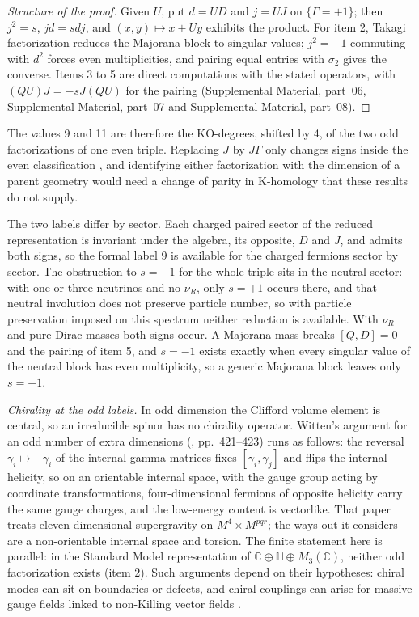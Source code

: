 \documentclass[aps,prd,reprint,onecolumn,nofootinbib,amsmath,amssymb,floatfix]{revtex4-2}
\theoremstyle{plain}
\newcommand{\supp}[1]{Supplemental Material, part~#1}
\newcommand{\C}{\mathbb C}
\renewcommand{\H}{\mathbb H}
\begin{document}
\begin{proof}[Structure of the proof]
Given $U$, put $d=UD$ and $j=UJ$ on $\{\Gamma=+1\}$; then $j^2=s$, $jd=sdj$, and $(x,y)\mapsto x+Uy$ exhibits the product. For item 2, Takagi factorization reduces the Majorana block to singular values; $j^2=-1$ commuting with $d^2$ forces even multiplicities, and pairing equal entries with $\sigma_2$ gives the converse. Items 3 to 5 are direct computations with the stated operators, with $(QU)J=-sJ(QU)$ for the pairing (\supp{06}, \supp{07} and \supp{08}).
\end{proof}

The values 9 and 11 are therefore the KO-degrees, shifted by 4, of the two odd factorizations of one even triple. Replacing $J$ by $J\Gamma$ only changes signs inside the even classification \cite{DD2011}, and identifying either factorization with the dimension of a parent geometry would need a change of parity in K-homology that these results do not supply.

The two labels differ by sector. Each charged paired sector of the reduced representation is invariant under the algebra, its opposite, $D$ and $J$, and admits both signs, so the formal label 9 is available for the charged fermions sector by sector. The obstruction to $s=-1$ for the whole triple sits in the neutral sector: with one or three neutrinos and no $\nu_R$, only $s=+1$ occurs there, and that neutral involution does not preserve particle number, so with particle preservation imposed on this spectrum neither reduction is available. With $\nu_R$ and pure Dirac masses both signs occur. A Majorana mass breaks $[Q,D]=0$ and the pairing of item 5, and $s=-1$ exists exactly when every singular value of the neutral block has even multiplicity, so a generic Majorana block leaves only $s=+1$.

\emph{Chirality at the odd labels.} In odd dimension the Clifford volume element is central, so an irreducible spinor has no chirality operator. Witten's argument for an odd number of extra dimensions (\cite{Witten1981}, pp.~421--423) runs as follows: the reversal $\gamma_i\mapsto-\gamma_i$ of the internal gamma matrices fixes $[\gamma_i,\gamma_j]$ and flips the internal helicity, so on an orientable internal space, with the gauge group acting by coordinate transformations, four-dimensional fermions of opposite helicity carry the same gauge charges, and the low-energy content is vectorlike. That paper treats eleven-dimensional supergravity on $M^4\times M^{pqr}$; the ways out it considers are a non-orientable internal space and torsion. The finite statement here is parallel: in the Standard Model representation of $\C\oplus\H\oplus M_3(\C)$, neither odd factorization exists (item 2). Such arguments depend on their hypotheses: chiral modes can sit on boundaries or defects, and chiral couplings can arise for massive gauge fields linked to non-Killing vector fields \cite{Baptista2026}.
\end{document}

